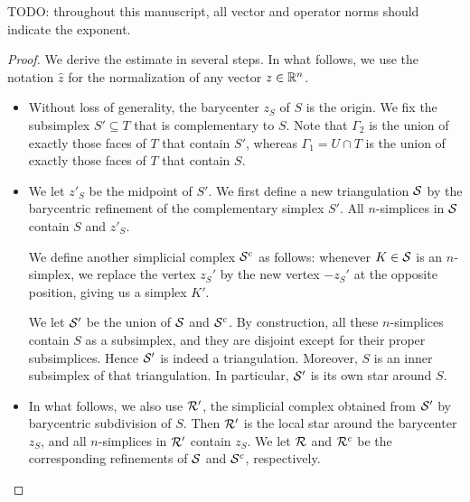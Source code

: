 \documentclass[10pt,letterpaper]{article}
\newcommand{\mwl}[1]{{\color{red}#1}}
\begin{document}
\mwl{TODO: throughout this manuscript, all vector and operator norms should indicate the exponent.}
\begin{proof}
    We derive the estimate in several steps. 
    In what follows, we use the notation $\hat z$ for the normalization of any vector $z \in {\mathbb R}^{n}$.
    \begin{itemize}
        \item 
        Without loss of generality, the barycenter $z_{S}$ of $S$ is the origin. 
        We fix the subsimplex $S' \subseteq T$ that is complementary to $S$.
        Note that ${\Gamma_2}$ is the union of exactly those faces of $T$ that contain $S'$,
        whereas ${\Gamma_1} = U \cap T$ is the union of exactly those faces of $T$ that contain $S$. 
        
        
        \item 
        We let $z'_{S}$ be the midpoint of $S'$. 
        We first define a new triangulation ${\mathcal S}$ by the barycentric refinement of the complementary simplex $S'$. 
        All $n$-simplices in ${\mathcal S}$ contain $S$ and $z'_{S}$.
        
        We define another simplicial complex ${\mathcal S}^c$ as follows:
        whenever $K \in {\mathcal S}$ is an $n$-simplex, 
        we replace the vertex $z_{S}'$ by the new vertex $-z_{S}'$ at the opposite position,
        giving us a simplex $K'$. 
        
        We let ${\mathcal S}'$ be the union of ${\mathcal S}$ and ${\mathcal S}^c$. 
        By construction, all these $n$-simplices contain $S$ as a subsimplex,
        and they are disjoint except for their proper subsimplices. 
        Hence ${\mathcal S}'$ is indeed a triangulation. 
        Moreover, $S$ is an inner subsimplex of that triangulation. 
        In particular, ${\mathcal S}'$ is its own star around $S$.
        
        
        \item 
        In what follows, we also use ${\mathcal R}'$, 
        the simplicial complex obtained from ${\mathcal S}'$ by barycentric subdivision of $S$.
        Then ${\mathcal R}'$ is the local star around the barycenter $z_S$,
        and all $n$-simplices in ${\mathcal R}'$ contain $z_{S}$. 
        We let ${\mathcal R}$ and ${\mathcal R}^{c}$ be the corresponding refinements of ${\mathcal S}$ and ${\mathcal S}^{c}$, respectively.
        

\end{itemize}
\end{proof}
\end{document}
